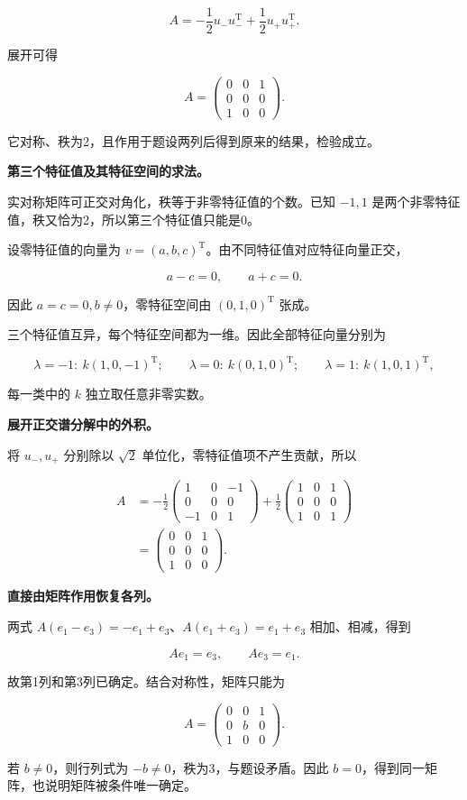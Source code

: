 \documentclass[UTF8,11pt,fontset=windows]{ctexart}
\begin{document}
$$
A=-\frac12u_-u_-^{\mathrm T}+\frac12u_+u_+^{\mathrm T}.
$$

展开可得

$$
A=\begin{pmatrix}0&0&1\\0&0&0\\1&0&0\end{pmatrix}.
$$

它对称、秩为2，且作用于题设两列后得到原来的结果，检验成立。

\textbf{第三个特征值及其特征空间的求法。}

实对称矩阵可正交对角化，秩等于非零特征值的个数。已知 $-1,1$ 是两个非零特征值，秩又恰为2，所以第三个特征值只能是0。

设零特征值的向量为 $v=(a,b,c)^{\mathrm T}$。由不同特征值对应特征向量正交，

$$
a-c=0,\qquad a+c=0.
$$

因此 $a=c=0,b\ne0$，零特征空间由 $(0,1,0)^{\mathrm T}$ 张成。

三个特征值互异，每个特征空间都为一维。因此全部特征向量分别为

$$
\lambda=-1:\ k(1,0,-1)^{\mathrm T};\qquad
\lambda=0:\ k(0,1,0)^{\mathrm T};\qquad
\lambda=1:\ k(1,0,1)^{\mathrm T},
$$

每一类中的 $k$ 独立取任意非零实数。

\textbf{展开正交谱分解中的外积。}

将 $u_-,u_+$ 分别除以 $\sqrt2$ 单位化，零特征值项不产生贡献，所以

$$
\begin{aligned}
A
&=-\frac12\begin{pmatrix}1&0&-1\\0&0&0\\-1&0&1\end{pmatrix}
+\frac12\begin{pmatrix}1&0&1\\0&0&0\\1&0&1\end{pmatrix}\\
&=\begin{pmatrix}0&0&1\\0&0&0\\1&0&0\end{pmatrix}.
\end{aligned}
$$

\textbf{直接由矩阵作用恢复各列。}

两式 $A(e_1-e_3)=-e_1+e_3$、$A(e_1+e_3)=e_1+e_3$ 相加、相减，得到

$$
Ae_1=e_3,\qquad Ae_3=e_1.
$$

故第1列和第3列已确定。结合对称性，矩阵只能为

$$
A=\begin{pmatrix}0&0&1\\0&b&0\\1&0&0\end{pmatrix}.
$$

若 $b\ne0$，则行列式为 $-b\ne0$，秩为3，与题设矛盾。因此 $b=0$，得到同一矩阵，也说明矩阵被条件唯一确定。
\end{document}
